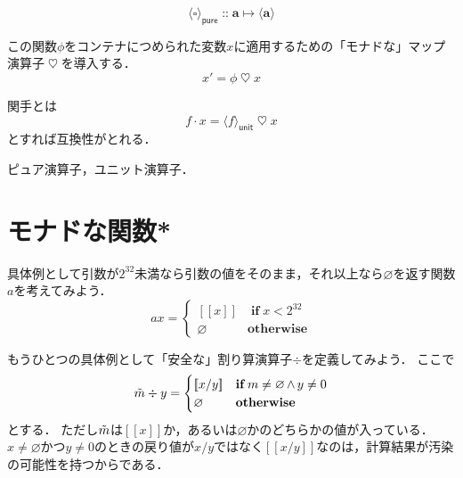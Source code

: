 \documentclass[twocolumn]{jsbook}
\def\[{[\![}
\def\]{]\!]}
\newcommand{\hsklType}[1]{\textbf{#1}}
\DeclareMathOperator{\hsklFmap}{\cdot}
\DeclareMathOperator{\hsklMonadMap}{\heartsuit}
\newcommand{\hsklNothing}{\varnothing}
\newcommand{\hsklJust}[1]{\[#1\]}
\newcommand{\hsklMaybe}[1]{\Tilde{#1}}
\newcommand{\hsklPure}[1]{\langle#1\rangle_\textsf{pure}}
\newcommand{\hsklUnit}[1]{\langle#1\rangle_\textsf{unit}}
\newcommand{\mathKeyword}[1]{\mathbf{#1}}
\DeclareMathOperator{\mathAnd}{\wedge}
\DeclareMathOperator{\mathIf}{\mathKeyword{if}}
\DeclareMathOperator{\mathIn}{::}
\DeclareMathOperator{\mathMapsTo}{\mapsto}
\newcommand{\mathOtherwise}{\mathKeyword{otherwise}}
\newcommand{\mathSomething}{\square}
\newcommand{\mathMorph}[2]{#1\mathMapsTo#2}
\begin{document}
$$\hsklPure{\mathSomething}\mathIn\mathMorph{\hsklType{a}}{\langle\hsklType{a}\rangle}$$

この関数$\phi$をコンテナにつめられた変数$x$に適用するための「モナドな」マップ演算子$\hsklMonadMap$を導入する．
$$x'=\phi\hsklMonadMap x$$

関手とは
$$f\hsklFmap x=\hsklUnit{f}\hsklMonadMap x$$
とすれば互換性がとれる．


ピュア演算子，ユニット演算子．


\section{モナドな関数*}


具体例として引数が$2^{32}$未満なら引数の値をそのまま，それ以上なら$\hsklNothing$を返す関数$a$を考えてみよう．
\begin{equation*}
ax=\begin{cases}
\hsklJust{x}&\mathIf x<2^{32}\\
\hsklNothing&\mathOtherwise
\end{cases}
\end{equation*}


もうひとつの具体例として「安全な」割り算演算子$\div$を定義してみよう．
ここで
\begin{equation*}
\hsklMaybe{m}\div y=\begin{cases}\hsklJust{x/y}&\mathIf m\neq\hsklNothing\mathAnd y\neq0\\
\hsklNothing&\mathOtherwise\end{cases}
\end{equation*}
とする．
ただし$\hsklMaybe{m}$は$\hsklJust{x}$か，あるいは$\hsklNothing$かのどちらかの値が入っている．
$x\neq\hsklNothing$かつ$y\neq0$のときの戻り値が$x/y$ではなく$\hsklJust{x/y}$なのは，計算結果が汚染の可能性を持つからである．
\end{document}
